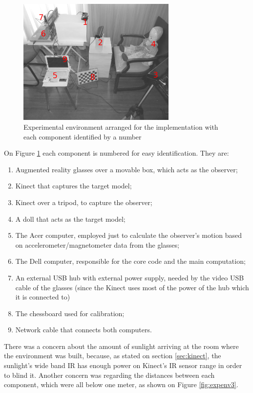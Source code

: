 \documentclass[msc, a4paper, classic, en]{ufbathesis}
\begin{document}
\begin{figure}
\centering
\includegraphics[width=0.7\textwidth]{images/expenv2.jpg}
\caption{Experimental environment arranged for the implementation with each component identified by a number}
\label{fig:expenv2}
\end{figure}

On Figure \ref{fig:expenv2} each component is numbered for easy identification. They are:

\begin{enumerate}
  \item Augmented reality glasses over a movable box, which acts as the observer;
  \item Kinect that captures the target model;
  \item Kinect over a tripod, to capture the observer;
  \item A doll that acts as the target model;
  \item The Acer computer, employed just to calculate the observer's motion based on accelerometer/magnetometer data from the glasses;
  \item The Dell computer, responsible for the core code and the main computation;
  \item An external USB hub with external power supply, needed by the video USB cable of the glasses (since the Kinect uses most of the power of the hub which it is connected to)
  \item The chessboard used for calibration;
  \item Network cable that connects both computers.
\end{enumerate}

There was a concern about the amount of sunlight arriving at the room where the environment was built, because, as stated on section \ref{sec:kinect}, the sunlight's wide band IR has enough power on Kinect's IR sensor range in order to blind it. Another concern was regarding the distances between each component, which were all below one meter, as shown on Figure \ref{fig:expenv3}.
\end{document}
